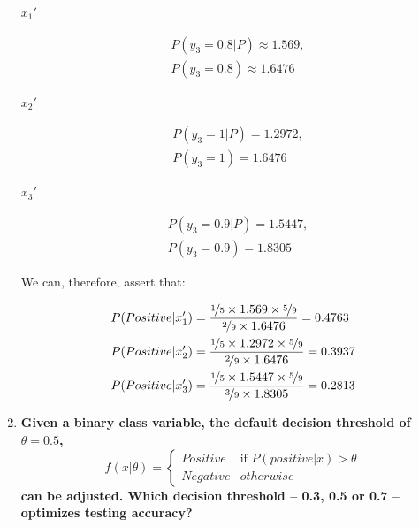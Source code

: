 \documentclass[12pt]{article}
\begin{document}
\begin{enumerate}[leftmargin=\labelsep]
  \begin{multicols}{3}
    \setlength{\columnseprule}{1pt}
    \def\columnseprulecolor{\color{black}}
    \centering

    $x_1'$

    $$
    \begin{aligned}
      &P(y_3 = 0.8 | P) \approx 1.569, \\
      &P(y_3 = 0.8) \approx 1.6476
    \end{aligned}
    $$

    \columnbreak

    $x_2'$

    $$
    \begin{aligned}
      &P(y_3 = 1 | P) = 1.2972, \\
      &P(y_3 = 1) = 1.6476
    \end{aligned}
    $$

    \columnbreak

    $x_3'$

    $$
    \begin{aligned}
      &P(y_3 = 0.9 | P) = 1.5447, \\
      &P(y_3 = 0.9) = 1.8305
    \end{aligned}
    $$

  \end{multicols}

  We can, therefore, assert that:

  \begin{align*}
    P(Positive | x_1') &= \frac{\nicefrac{1}{5} \times 1.569 \times \nicefrac{5}{9}}{\nicefrac{2}{9} \times 1.6476} = 0.4763 \\
    P(Positive | x_2') &= \frac{\nicefrac{1}{5} \times 1.2972 \times \nicefrac{5}{9}}{\nicefrac{2}{9} \times 1.6476} = 0.3937 \\
    P(Positive | x_3') &= \frac{\nicefrac{1}{5} \times 1.5447 \times \nicefrac{5}{9}}{\nicefrac{3}{9} \times 1.8305} = 0.2813
  \end{align*}

  \pagebreak

  \item \textbf{Given a binary class variable, the default decision threshold of $\theta = 0.5$,
    $$
    f(x | \theta) = \begin{cases}
      Positive & \text{if } P(positive | x) > \theta \\
      Negative & otherwise
    \end{cases}
    $$
    can be adjusted. Which decision threshold – 0.3, 0.5 or 0.7 – optimizes testing accuracy?
  }


\end{enumerate}
\end{document}

